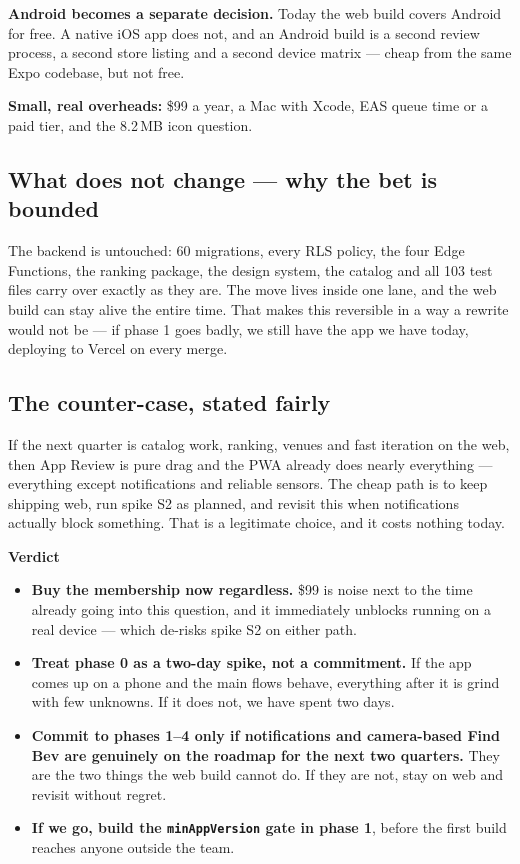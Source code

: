 \documentclass[11pt]{article}
\newcommand{\code}[1]{\texttt{\small #1}}
\begin{document}
\textbf{Android becomes a separate decision.} Today the web build covers Android for free. A native
iOS app does not, and an Android build is a second review process, a second store listing and a
second device matrix --- cheap from the same Expo codebase, but not free.

\textbf{Small, real overheads:} \$99 a year, a Mac with Xcode, EAS queue time or a paid tier, and the
8.2\,MB icon question.

\subsection{What does not change --- why the bet is bounded}

The backend is untouched: 60 migrations, every RLS policy, the four Edge Functions, the ranking
package, the design system, the catalog and all 103 test files carry over exactly as they are. The
move lives inside one lane, and the web build can stay alive the entire time. That makes this
reversible in a way a rewrite would not be --- if phase 1 goes badly, we still have the app we have
today, deploying to Vercel on every merge.

\subsection{The counter-case, stated fairly}

If the next quarter is catalog work, ranking, venues and fast iteration on the web, then App Review
is pure drag and the PWA already does nearly everything --- everything except notifications and
reliable sensors. The cheap path is to keep shipping web, run spike S2 as planned, and revisit this
when notifications actually block something. That is a legitimate choice, and it costs nothing today.

\begin{callout}
\textbf{\color{ink}Verdict}

\begin{itemize}[leftmargin=1.2em,itemsep=0.5em,topsep=0.5em]
  \item \textbf{Buy the membership now regardless.} \$99 is noise next to the time already going into
  this question, and it immediately unblocks running on a real device --- which de-risks spike S2 on
  either path.
  \item \textbf{Treat phase 0 as a two-day spike, not a commitment.} If the app comes up on a phone
  and the main flows behave, everything after it is grind with few unknowns. If it does not, we have
  spent two days.
  \item \textbf{Commit to phases 1--4 only if notifications and camera-based Find Bev are genuinely
  on the roadmap for the next two quarters.} They are the two things the web build cannot do. If they
  are not, stay on web and revisit without regret.
  \item \textbf{If we go, build the \code{minAppVersion} gate in phase 1}, before the first build
  reaches anyone outside the team.
\end{itemize}
\end{callout}
\end{document}
